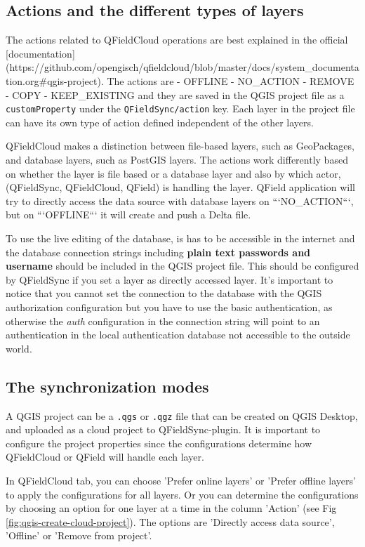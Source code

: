 \documentclass{article}
\begin{document}
\subsection{Actions and the different types of layers}
\begin{markdown}
The actions related to QFieldCloud operations are best explained in the official [documentation](https://github.com/opengisch/qfieldcloud/blob/master/docs/system_documentation.org#qgis-project). The actions are
- OFFLINE
- NO_ACTION
- REMOVE
- COPY
- KEEP_EXISTING
and they are saved in the QGIS project file as a \texttt{customProperty} under the \texttt{QFieldSync/action} key. Each layer in the project file can have its own type of action defined independent of the other layers.

QFieldCloud makes a distinction between file-based layers, such as GeoPackages, and database layers, such as PostGIS layers. The actions work differently based on whether the layer is file based or a database layer and also by which actor, (QFieldSync, QFieldCloud, QField)  is handling the layer. QField application will try to directly access the data source with database layers on ```NO_ACTION```, but on ```OFFLINE``` it will create and push a Delta file. 

To use the live editing of the database, is has to be accessible in the internet and the database connection strings including \textbf{plain text passwords and username} should be included in the QGIS project file. This should be configured by QFieldSync if you set a layer as directly accessed layer. It's important to notice that you cannot set the connection to the database with the QGIS authorization configuration but you have to use the basic authentication, as otherwise the \emph{auth} configuration in the connection string will point to an authentication in the local authentication database not accessible to the outside world. 
\end{markdown}


\subsection{The synchronization modes}
A QGIS project can be a \texttt{.qgs} or \texttt{.qgz} file that can be created on QGIS Desktop, and uploaded as a cloud project to QFieldSync-plugin. It is important to configure the project properties since the configurations determine how QFieldCloud or QField will handle each layer.

In QFieldCloud tab, you can choose 'Prefer online layers' or 'Prefer offline layers' to apply the configurations for all layers. Or you can determine the configurations by choosing an option for one layer at a time in the column 'Action' (see Fig \ref{fig:qgis-create-cloud-project}). The options are 'Directly access data source', 'Offline' or 'Remove from project'.
\end{document}
